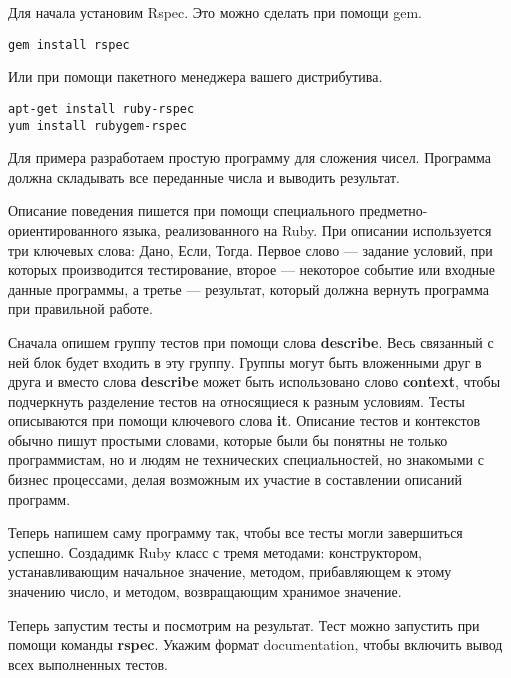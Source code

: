 Для начала установим Rspec. Это можно сделать при помощи gem.

\begin{verbatim}
gem install rspec
\end{verbatim}

Или при помощи пакетного менеджера вашего дистрибутива.

\begin{verbatim}
apt-get install ruby-rspec
yum install rubygem-rspec
\end{verbatim}

Для примера разработаем простую программу для сложения чисел. Программа должна складывать все переданные числа и выводить результат.

Описание поведения пишется при помощи специального предметно-ориентированного языка, реализованного на Ruby. При описании используется три ключевых слова: Дано, Если, Тогда. Первое слово --- задание условий, при которых производится тестирование, второе --- некоторое событие или входные данные программы, а третье --- результат, который должна вернуть программа при правильной работе.

Сначала опишем группу тестов при помощи слова \textbf{describe}. Весь связанный с ней блок будет входить в эту группу. Группы могут быть вложенными друг в друга и вместо слова \textbf{describe} может быть использовано слово \textbf{context}, чтобы подчеркнуть разделение тестов на относящиеся к разным условиям. Тесты описываются при помощи ключевого слова \textbf{it}. Описание тестов и контекстов обычно пишут простыми словами, которые были бы понятны не только программистам, но и людям не технических специальностей, но знакомыми с бизнес процессами, делая возможным их участие в составлении описаний программ.



Теперь напишем саму программу так, чтобы все тесты могли завершиться успешно. Создадимк Ruby класс с тремя методами: конструктором, устанавливающим начальное значение, методом, прибавляющем к этому значению число, и методом, возвращающим хранимое значение.



Теперь запустим тесты и посмотрим на результат. Тест можно запустить при помощи команды \textbf{rspec}. Укажим формат documentation, чтобы включить вывод всех выполненных тестов.

